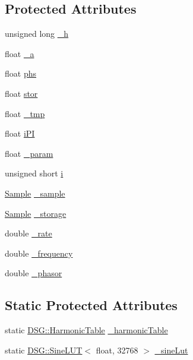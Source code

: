 \subsection*{Protected Attributes}
\begin{DoxyCompactItemize}
\item 
unsigned long \hyperlink{classDSG_1_1FourierSaw_afaa437e6dda9ddbd4f011012dfe3c55a}{\+\_\+h}
\item 
float \hyperlink{classDSG_1_1FourierSaw_a44f77f54a92eb8bc1fe3d116bdb01e5f}{\+\_\+a}
\item 
float \hyperlink{classDSG_1_1FourierSaw_a8e8c9940318ca36eb5f10a8c5dfa6264}{phs}
\item 
float \hyperlink{classDSG_1_1FourierSaw_ae4fd4aba08605f9a7934831b6c171027}{stor}
\item 
float \hyperlink{classDSG_1_1FourierSaw_afc22691229a12cd83726f09634d60d3b}{\+\_\+tmp}
\item 
float \hyperlink{classDSG_1_1FourierSaw_a862f4353823d0d1fb26355a4aaeced3a}{i\+P\+I}
\item 
float \hyperlink{classDSG_1_1FourierSaw_a23bf3488fcdfb556df02d8cf0103e30f}{\+\_\+param}
\item 
unsigned short \hyperlink{classDSG_1_1FourierSaw_ad4fecfc1b1500bc514fb2d9e794ef411}{i}
\item 
\hyperlink{classDSG_1_1Sample}{Sample} \hyperlink{classDSG_1_1FourierGenerator_ab96bed1cd59c42e82a689036e5c62bef}{\+\_\+sample}
\item 
\hyperlink{classDSG_1_1Sample}{Sample} \hyperlink{classDSG_1_1FourierGenerator_a6b7f2439b26914cc9df6b6975a2cedac}{\+\_\+storage}
\item 
double \hyperlink{classDSG_1_1SignalGenerator_aa10f6c85d9adee901139ea7fb346f39d}{\+\_\+rate}
\item 
double \hyperlink{classDSG_1_1SignalGenerator_a67e296e3506dcdf09402c667cddff9ac}{\+\_\+frequency}
\item 
double \hyperlink{classDSG_1_1SignalGenerator_ac2271b582bf699275f077ecb642a8cd9}{\+\_\+phasor}
\end{DoxyCompactItemize}
\subsection*{Static Protected Attributes}
\begin{DoxyCompactItemize}
\item 
static \hyperlink{classDSG_1_1HarmonicTable}{D\+S\+G\+::\+Harmonic\+Table} \hyperlink{classDSG_1_1FourierGenerator_a7288408f8e44d5edb5eecc62480243d7}{\+\_\+harmonic\+Table}
\item 
static \hyperlink{classDSG_1_1SineLUT}{D\+S\+G\+::\+Sine\+L\+U\+T}$<$ float, 32768 $>$ \hyperlink{classDSG_1_1FourierGenerator_a1ae5fb243ce05e638bdf0dec8bde7426}{\+\_\+sine\+Lut}
\end{DoxyCompactItemize}


